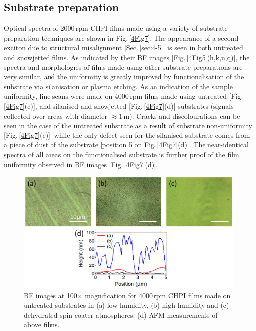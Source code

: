 \subsection{Substrate preparation}
Optical spectra of 2000\,rpm CHPI films made using a variety of substrate preparation techniques are shown in Fig.\,\ref{4Fig7}. The appearance of a second exciton due to structural misalignment [Sec.\,\ref{sec:4-5}] is seen in both untreated and snowjetted films. As indicated by their BF images [Fig.\,\ref{4Fig5}(h,k,n,q)], the spectra and morphologies of films made using other substrate preparations are very similar, and the uniformity is greatly improved by functionalisation of the substrate via silanisation or plasma etching. As an indication of the sample uniformity, line scans were made on 4000\,rpm films made using untreated [Fig.\,\ref{4Fig7}(c)], and silanised and snowjetted [Fig.\,\ref{4Fig7}(d)] substrates (signals collected over areas with diameter $\approx1\,$\textmu m). Cracks and discolourations can be seen in the case of the untreated substrate as a result of substrate non-uniformity [Fig.\,\ref{4Fig7}(c)], while the only defect seen for the silanised substrate comes from a piece of dust of the substrate [position 5 on Fig.\,\ref{4Fig7}(d)]. The near-identical spectra of all areas on the functionalised substrate is further proof of the film uniformity observed in BF images [Fig.\,\ref{4Fig7}(d)].

\begin{figure}[h!] 
\centering    
\includegraphics[width=\textwidth]{Fig8}
\caption{BF images at 100$\times$ magnification for 4000\,rpm CHPI films made on untreated substrates in (a) low humidity, (b) high humidity and (c) dehydrated spin coater atmospheres. (d) AFM measurements of above films.}
\label{4Fig8}
\end{figure}
